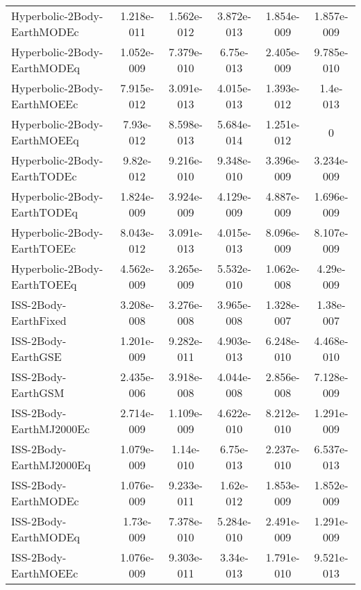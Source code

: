 \begin{table}[htbp!]
\begin{tabular}{lccccc}
         Hyperbolic-2Body-EarthMODEc & 1.218e-011 & 1.562e-012 & 3.872e-013 & 1.854e-009 & 1.857e-009 \\
         Hyperbolic-2Body-EarthMODEq & 1.052e-009 & 7.379e-010 & 6.75e-013 & 2.405e-009 & 9.785e-010 \\
         Hyperbolic-2Body-EarthMOEEc & 7.915e-012 & 3.091e-013 & 4.015e-013 & 1.393e-012 & 1.4e-013 \\
         Hyperbolic-2Body-EarthMOEEq & 7.93e-012 & 8.598e-013 & 5.684e-014 & 1.251e-012 & 0 \\
         Hyperbolic-2Body-EarthTODEc & 9.82e-012 & 9.216e-010 & 9.348e-010 & 3.396e-009 & 3.234e-009 \\
         Hyperbolic-2Body-EarthTODEq & 1.824e-009 & 3.924e-009 & 4.129e-009 & 4.887e-009 & 1.696e-009 \\
         Hyperbolic-2Body-EarthTOEEc & 8.043e-012 & 3.091e-013 & 4.015e-013 & 8.096e-009 & 8.107e-009 \\
         Hyperbolic-2Body-EarthTOEEq & 4.562e-009 & 3.265e-009 & 5.532e-010 & 1.062e-008 & 4.29e-009 \\
         ISS-2Body-EarthFixed & 3.208e-008 & 3.276e-008 & 3.965e-008 & 1.328e-007 & 1.38e-007 \\
         ISS-2Body-EarthGSE & 1.201e-009 & 9.282e-011 & 4.903e-013 & 6.248e-010 & 4.468e-010 \\
         ISS-2Body-EarthGSM & 2.435e-006 & 3.918e-008 & 4.044e-008 & 2.856e-008 & 7.128e-009 \\
         ISS-2Body-EarthMJ2000Ec & 2.714e-009 & 1.109e-009 & 4.622e-010 & 8.212e-010 & 1.291e-009 \\
         ISS-2Body-EarthMJ2000Eq & 1.079e-009 & 1.14e-010 & 6.75e-013 & 2.237e-010 & 6.537e-013 \\
         ISS-2Body-EarthMODEc & 1.076e-009 & 9.233e-011 & 1.62e-012 & 1.853e-009 & 1.852e-009 \\
         ISS-2Body-EarthMODEq & 1.73e-009 & 7.378e-010 & 5.284e-010 & 2.491e-009 & 1.291e-009 \\
         ISS-2Body-EarthMOEEc & 1.076e-009 & 9.303e-011 & 3.34e-013 & 1.791e-010 & 9.521e-013 \\

\end{tabular}
\end{table}
